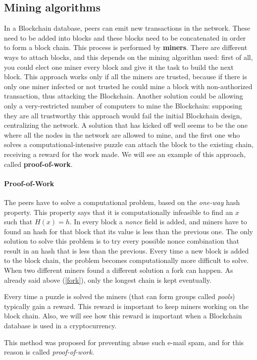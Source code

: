 \subsection{Mining algorithms}
In a Blockchain database, peers can emit new transactions in the network. These
need to be added into blocks and these blocks need to be concatenated in order
to form a block chain. This process is performed by \textbf{miners}.
There are different ways to attach blocks, and this depends on the mining
algorithm used: first of all, you could elect one miner every block and give
it the task to build the next block. This approach works only if all the miners
are trusted, because if there is only one miner infected or not trusted he
could mine a block with non-authorized transaction, thus attacking the
Blockchain. Another solution could be allowing only a very-restricted number of
computers to mine the Blockchain: supposing they are all trustworthy this
approach would fail the initial Blockchain design, centralizing the
network.
A solution that has kicked off well seems to be the one where all the nodes in
the network are allowed to mine, and the first one who solves a
computational-intensive puzzle can attach the block to the existing chain,
receiving a reward for the work made. We will see an example of this approach,
called \textbf{proof-of-work}.


\paragraph{Proof-of-Work}

The peers have to solve a computational problem, based on the \textit{one-way}
hash property. This property says that it is computationally infeasible to find
an $x$ such that $H(x) = h$.
In every block a \textit{nonce} field is added, and miners have to found an
hash for that block that its value is less than the previous one\cite{sok15}.
The only solution to solve this problem is to try every possible nonce
combination that result in an hash that is less than the previous. Every time a
new block is added to the block chain, the problem becomes computationally more
difficult to solve.
When two different miners found a different solution a fork can happen. As
already said above (\ref{fork}), only the longest chain is kept eventually.

Every time a puzzle is solved the miners (that can form groups called
\textit{pools}) typically gain a reward. This reward is important to keep miners
working on the block chain. Also, we will see how this reward is important when
a Blockchain database is used in a cryptocurrency.

This method was proposed for preventing abuse such e-mail spam, and for this
reason is called \textit{proof-of-work}\cite{back02}.
